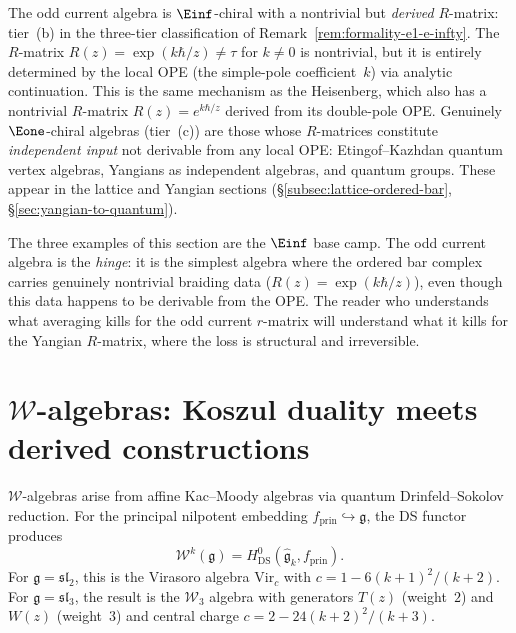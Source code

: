\begin{remark}
\label{rem:rosetta-cs-operadic}
The odd current algebra is $\Einf$-chiral with a nontrivial but
\emph{derived} $R$-matrix: tier~(b) in the three-tier classification
of Remark~\ref{rem:formality-e1-e-infty}. The $R$-matrix
$R(z) = \exp(k\hbar/z) \neq \tau$ for $k \neq 0$ is nontrivial,
but it is entirely determined by the local OPE (the simple-pole
coefficient~$k$) via analytic continuation. This is the same
mechanism as the Heisenberg, which also has a nontrivial
$R$-matrix $R(z) = e^{k\hbar/z}$ derived from its double-pole
OPE. Genuinely $\Eone$-chiral algebras (tier~(c)) are those
whose $R$-matrices constitute \emph{independent input} not
derivable from any local OPE: Etingof--Kazhdan quantum vertex
algebras, Yangians as independent algebras, and quantum groups.
These appear in the lattice and Yangian sections
(\S\ref{subsec:lattice-ordered-bar},
\S\ref{sec:yangian-to-quantum}).

The three examples of this section are the $\Einf$ base camp.
The odd current algebra is the \emph{hinge}: it is the simplest
algebra where the ordered bar complex carries genuinely nontrivial
braiding data ($R(z) = \exp(k\hbar/z)$), even though this data happens to
be derivable from the OPE. The reader who understands what
averaging kills for the odd current $r$-matrix will understand what it
kills for the Yangian $R$-matrix, where the loss is structural
and irreversible.
\end{remark}


\section{\texorpdfstring{$\mathcal{W}$-algebras: Koszul duality meets derived constructions}{W-algebras: Koszul duality meets derived constructions}}
\label{sec:frame-w-algebras}

$\mathcal{W}$-algebras arise from affine Kac--Moody algebras via
quantum Drinfeld--Sokolov reduction. For the principal nilpotent
embedding $f_{\mathrm{prin}} \hookrightarrow \mathfrak{g}$, the DS
functor produces
\begin{equation}\label{eq:frame-ds-definition}
\mathcal{W}^k(\mathfrak{g})
= H^0_{\mathrm{DS}}(\widehat{\mathfrak{g}}_k, f_{\mathrm{prin}}).
\end{equation}
For $\mathfrak{g} = \mathfrak{sl}_2$, this is the Virasoro algebra
$\mathrm{Vir}_c$ with $c = 1 - 6(k+1)^2/(k+2)$.
For $\mathfrak{g} = \mathfrak{sl}_3$, the result is the
$\mathcal{W}_3$ algebra with generators $T(z)$ (weight~$2$) and
$W(z)$ (weight~$3$) and central charge $c = 2 - 24(k+2)^2/(k+3)$.

